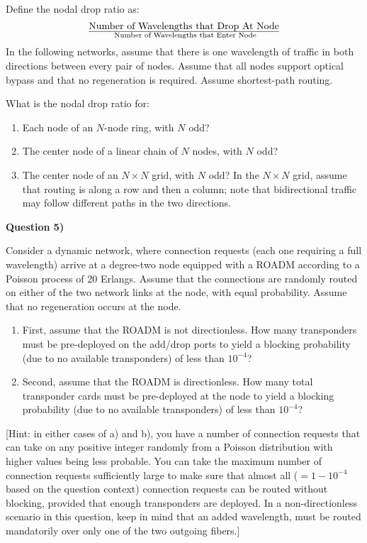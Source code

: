 \documentclass[10pt,letterpaper]{article}
\newcommand{\Q}[1]{\textbf{Question #1)}}
\newcommand{\nl}{\newline\newline}
\begin{document}
Define the nodal drop ratio as:
\[
\text{Number of Wavelengths that Drop At Node}\over
\text{
Number of Wavelengths that Enter Node}
\]
In the following networks, assume that there is one wavelength of traffic in
both directions between every pair of nodes. Assume that all nodes support
optical bypass and that no regeneration is required. Assume shortest-path routing.

What is the nodal drop ratio for:
\begin{enumerate}[label=\alph*)]
\item
Each node of an $N$-node ring, with $N$ odd?
\item
The center node of a linear chain of $N$ nodes, with $N$ odd?
\item
The center node of an $N\times N$ grid, with $N$ odd? In the $N\times N$ grid, assume that routing is along a row and then a column; note that bidirectional traffic may follow different paths in the two directions.
\end{enumerate}
\Q5

Consider a dynamic network, where connection requests (each one requiring a full wavelength) arrive at a degree-two node equipped with a ROADM according to a Poisson process of 20 Erlangs. Assume that the connections are randomly routed on either of the two network links at the node, with equal probability. Assume that no regeneration occurs at the node.
\begin{enumerate}[label=\alph*)]
\item
First, assume that the ROADM is not directionless. How many transponders must be pre-deployed on the add/drop ports to yield a blocking probability (due to no available transponders) of less than $10^{-4}$?
\item
Second, assume that the ROADM is directionless. How many total transponder cards must be pre-deployed at the node to yield a blocking probability (due to no available transponders) of less than $10^{-4}$?
\end{enumerate}

[Hint: in either cases of a) and b), you have a number of connection requests that can take on any positive integer randomly from a Poisson distribution with higher values being less probable. You can take the maximum number of connection requests sufficiently large to make sure that almost all ($=1-10^{-4}$ based on the question context) connection requests can be routed without blocking, provided that enough transponders are deployed. In a non-directionless scenario in this question, keep in mind that an added wavelength, must be routed mandatorily over only one of the two outgoing fibers.]
%
\end{document}
